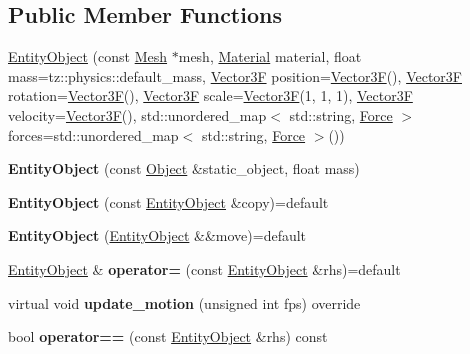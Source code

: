 \subsection*{Public Member Functions}
\begin{DoxyCompactItemize}
\item 
\mbox{\hyperlink{class_entity_object_a61a11b3d675a49b17b9f9a0b6130f015}{Entity\+Object}} (const \mbox{\hyperlink{class_mesh}{Mesh}} $\ast$mesh, \mbox{\hyperlink{class_material}{Material}} material, float mass=tz\+::physics\+::default\+\_\+mass, \mbox{\hyperlink{class_vector3}{Vector3F}} position=\mbox{\hyperlink{class_vector3}{Vector3F}}(), \mbox{\hyperlink{class_vector3}{Vector3F}} rotation=\mbox{\hyperlink{class_vector3}{Vector3F}}(), \mbox{\hyperlink{class_vector3}{Vector3F}} scale=\mbox{\hyperlink{class_vector3}{Vector3F}}(1, 1, 1), \mbox{\hyperlink{class_vector3}{Vector3F}} velocity=\mbox{\hyperlink{class_vector3}{Vector3F}}(), std\+::unordered\+\_\+map$<$ std\+::string, \mbox{\hyperlink{class_force}{Force}} $>$ forces=std\+::unordered\+\_\+map$<$ std\+::string, \mbox{\hyperlink{class_force}{Force}} $>$())
\item 
\mbox{\label{class_entity_object_a9fad56777e7006ab1af94693543b0792}} 
{\bfseries Entity\+Object} (const \mbox{\hyperlink{class_object}{Object}} \&static\+\_\+object, float mass)
\item 
\mbox{\label{class_entity_object_a2971da030ade2f29e3e25643a416fcb0}} 
{\bfseries Entity\+Object} (const \mbox{\hyperlink{class_entity_object}{Entity\+Object}} \&copy)=default
\item 
\mbox{\label{class_entity_object_a86b26f07e950c0416946e82cbab47ab6}} 
{\bfseries Entity\+Object} (\mbox{\hyperlink{class_entity_object}{Entity\+Object}} \&\&move)=default
\item 
\mbox{\label{class_entity_object_a38bc800d3f77b7c029e00e055695f896}} 
\mbox{\hyperlink{class_entity_object}{Entity\+Object}} \& {\bfseries operator=} (const \mbox{\hyperlink{class_entity_object}{Entity\+Object}} \&rhs)=default
\item 
\mbox{\label{class_entity_object_a29150d60d661b8f2b11b374bd3f9b812}} 
virtual void {\bfseries update\+\_\+motion} (unsigned int fps) override
\item 
\mbox{\label{class_entity_object_a254dd086ab31866648e6337004804fdc}} 
bool {\bfseries operator==} (const \mbox{\hyperlink{class_entity_object}{Entity\+Object}} \&rhs) const
\end{DoxyCompactItemize}
